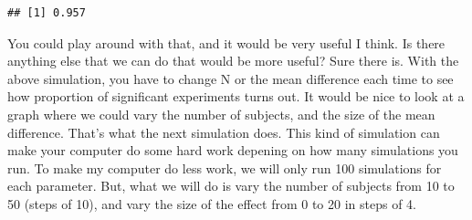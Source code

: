 \documentclass[]{book}
\newenvironment{Shaded}{\begin{snugshade}}{\end{snugshade}}
\newcommand{\ControlFlowTok}[1]{\textcolor[rgb]{0.13,0.29,0.53}{\textbf{#1}}}
\newcommand{\DataTypeTok}[1]{\textcolor[rgb]{0.13,0.29,0.53}{#1}}
\newcommand{\DecValTok}[1]{\textcolor[rgb]{0.00,0.00,0.81}{#1}}
\newcommand{\FloatTok}[1]{\textcolor[rgb]{0.00,0.00,0.81}{#1}}
\newcommand{\KeywordTok}[1]{\textcolor[rgb]{0.13,0.29,0.53}{\textbf{#1}}}
\newcommand{\NormalTok}[1]{#1}
\newcommand{\OperatorTok}[1]{\textcolor[rgb]{0.81,0.36,0.00}{\textbf{#1}}}
\newcommand{\OtherTok}[1]{\textcolor[rgb]{0.56,0.35,0.01}{#1}}
\newcommand{\StringTok}[1]{\textcolor[rgb]{0.31,0.60,0.02}{#1}}
\begin{document}
\begin{Shaded}
\end{Shaded}

\begin{verbatim}
## [1] 0.957
\end{verbatim}

You could play around with that, and it would be very useful I think. Is there anything else that we can do that would be more useful? Sure there is. With the above simulation, you have to change N or the mean difference each time to see how proportion of significant experiments turns out. It would be nice to look at a graph where we could vary the number of subjects, and the size of the mean difference. That's what the next simulation does. This kind of simulation can make your computer do some hard work depening on how many simulations you run. To make my computer do less work, we will only run 100 simulations for each parameter. But, what we will do is vary the number of subjects from 10 to 50 (steps of 10), and vary the size of the effect from 0 to 20 in steps of 4.
\end{document}

